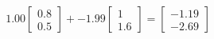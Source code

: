 \documentclass[preview]{standalone}
\begin{document}
\begin{align*}
1.00 \begin{bmatrix} 0.8 \\ 0.5 \end{bmatrix} + -1.99 \begin{bmatrix} 1 \\ 1.6 \end{bmatrix} = \begin{bmatrix} -1.19 \\ -2.69 \end{bmatrix}
\end{align*}
\end{document}
